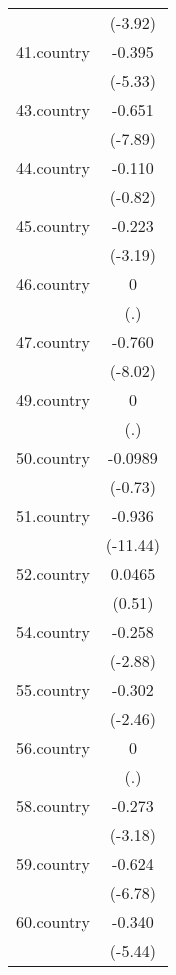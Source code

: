 {\begin{tabular}{l*{1}{c}}
            &     (-3.92)         \\
[1em]
41.country  &      -0.395\sym{***}\\
            &     (-5.33)         \\
[1em]
43.country  &      -0.651\sym{***}\\
            &     (-7.89)         \\
[1em]
44.country  &      -0.110         \\
            &     (-0.82)         \\
[1em]
45.country  &      -0.223\sym{**} \\
            &     (-3.19)         \\
[1em]
46.country  &           0         \\
            &         (.)         \\
[1em]
47.country  &      -0.760\sym{***}\\
            &     (-8.02)         \\
[1em]
49.country  &           0         \\
            &         (.)         \\
[1em]
50.country  &     -0.0989         \\
            &     (-0.73)         \\
[1em]
51.country  &      -0.936\sym{***}\\
            &    (-11.44)         \\
[1em]
52.country  &      0.0465         \\
            &      (0.51)         \\
[1em]
54.country  &      -0.258\sym{**} \\
            &     (-2.88)         \\
[1em]
55.country  &      -0.302\sym{*}  \\
            &     (-2.46)         \\
[1em]
56.country  &           0         \\
            &         (.)         \\
[1em]
58.country  &      -0.273\sym{**} \\
            &     (-3.18)         \\
[1em]
59.country  &      -0.624\sym{***}\\
            &     (-6.78)         \\
[1em]
60.country  &      -0.340\sym{***}\\
            &     (-5.44)         \\

\end{tabular}}
